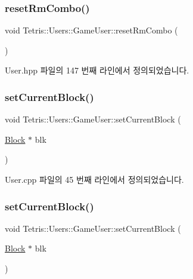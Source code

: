 \subsubsection{\texorpdfstring{reset\+Rm\+Combo()}{resetRmCombo()}}
{\footnotesize\ttfamily void Tetris\+::\+Users\+::\+Game\+User\+::reset\+Rm\+Combo (\begin{DoxyParamCaption}{ }\end{DoxyParamCaption})\hspace{0.3cm}{\ttfamily [inline]}}



User.\+hpp 파일의 147 번째 라인에서 정의되었습니다.

\mbox{\label{class_tetris_1_1_users_1_1_game_user_ae1743f8024d25ed74d7b2e456907ee41}} 
\subsubsection{\texorpdfstring{set\+Current\+Block()}{setCurrentBlock()}\hspace{0.1cm}{\footnotesize\ttfamily [1/2]}}
{\footnotesize\ttfamily void Tetris\+::\+Users\+::\+Game\+User\+::set\+Current\+Block (\begin{DoxyParamCaption}\item[{\hyperlink{class_tetris_1_1_block}{Block} $\ast$}]{blk }\end{DoxyParamCaption})}



User.\+cpp 파일의 45 번째 라인에서 정의되었습니다.

\mbox{\label{class_tetris_1_1_users_1_1_game_user_ae1743f8024d25ed74d7b2e456907ee41}} 
\subsubsection{\texorpdfstring{set\+Current\+Block()}{setCurrentBlock()}\hspace{0.1cm}{\footnotesize\ttfamily [2/2]}}
{\footnotesize\ttfamily void Tetris\+::\+Users\+::\+Game\+User\+::set\+Current\+Block (\begin{DoxyParamCaption}\item[{\hyperlink{class_tetris_1_1_block}{Block} $\ast$}]{blk }\end{DoxyParamCaption})\hspace{0.3cm}{\ttfamily [inline]}}



